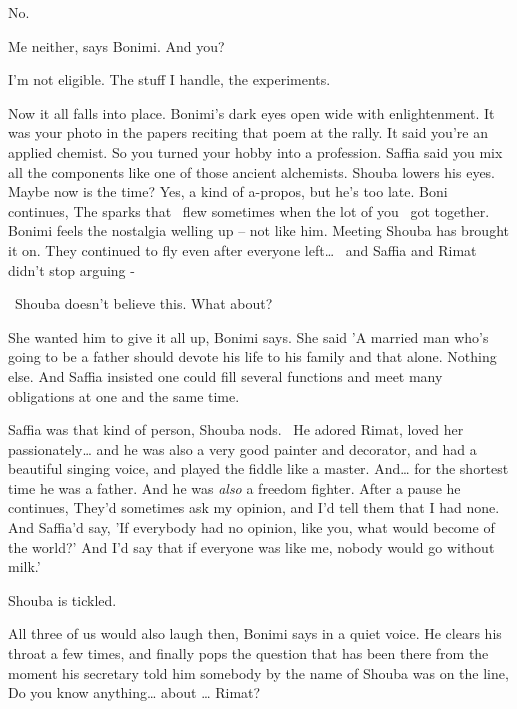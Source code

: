 \documentclass[12pt]{book}
\begin{document}
{\textquotedbl}No.{\textquotedbl}

{\textquotedbl}Me neither,{\textquotedbl} says Bonimi. {\textquotedbl}And you?{\textquotedbl}

{\textquotedbl}I'm not eligible. The stuff I handle, the experiments.{\textquotedbl}

{\textquotedbl}Now it all falls into place.{\textquotedbl} Bonimi's dark eyes open wide with enlightenment.
{\textquotedbl}It was your photo in the papers reciting that poem at the rally. It said you're an applied chemist. So
you turned your hobby into a profession. Saffia said you mix all the components like one of those ancient
alchemists.{\textquotedbl} Shouba lowers his eyes. Maybe now is the time? Yes, a kind of a-propos, but he's too late.
Boni continues, {\textquotedbl}The sparks that \ flew sometimes when the lot of you \ got together.{\textquotedbl}
Bonimi feels the nostalgia welling up -- not like him. Meeting Shouba has brought it on. {\textquotedbl}They continued
to fly even after everyone left{\dots} \ and Saffia and Rimat didn't stop arguing -{\textquotedbl}

~Shouba doesn't believe this. {\textquotedbl}What about?{\textquotedbl}

{\textquotedbl}She wanted {him} to give it all up,{\textquotedbl} Bonimi says. {\textquotedbl}She said
'A married man who's going to be a father should devote his life to his family and that alone. Nothing else. And Saffia
insisted one could fill several functions and meet many obligations at one and the same time.{\textquotedbl}

{\textquotedbl}Saffia was that kind of person,{\textquotedbl} Shouba nods. \ {\textquotedbl}He adored Rimat, loved her
passionately{\dots} and he was also a very good painter and decorator, and had a beautiful singing voice, and played
the fiddle like a master. And{\dots} for the shortest time he was a father. And he was \textit{also} a freedom
fighter.{\textquotedbl} After a pause he continues, {\textquotedbl}They'd sometimes ask my opinion, and I'd tell them
that I had none. And Saffia'd say, 'If everybody had no opinion, like you, what would become of the world?' And I'd say
that if everyone was like me, nobody would go without milk.'{\textquotedbl}

Shouba is tickled.

{\textquotedbl}All three of us would also laugh then,{\textquotedbl} Bonimi says in a quiet voice. He clears his throat
a few times, and finally pops the question that has been there from the moment his secretary told him somebody by the
name of Shouba was on the line, {\textquotedbl}Do you know anything{\dots} about {\dots} Rimat?{\textquotedbl}
\end{document}
